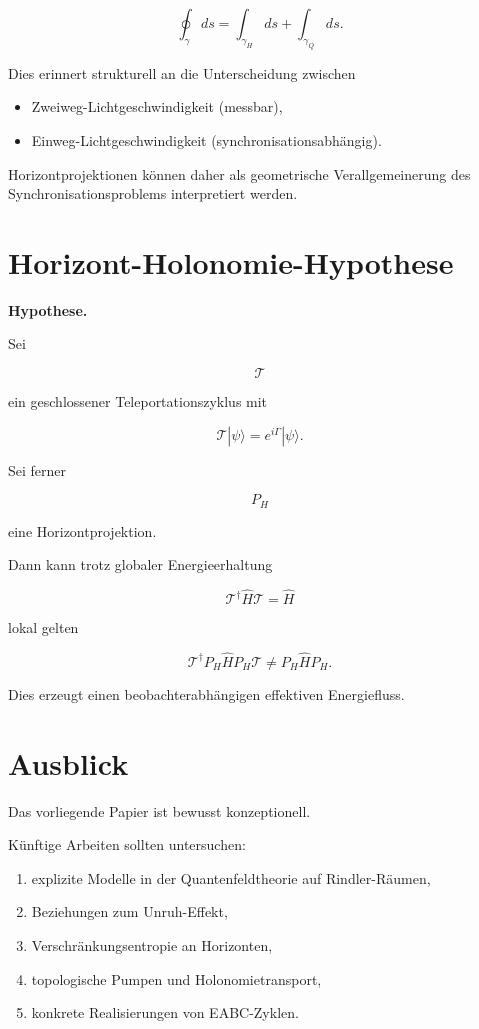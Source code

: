 \documentclass[11pt,a4paper]{article}
\begin{document}
	\[
	\oint_\gamma ds
	=
	\int_{\gamma_H} ds
	+
	\int_{\gamma_Q} ds.
	\]
	
	Dies erinnert strukturell an die Unterscheidung zwischen
	
	\begin{itemize}
		\item Zweiweg-Lichtgeschwindigkeit (messbar),
		\item Einweg-Lichtgeschwindigkeit (synchronisationsabhängig).
	\end{itemize}
	
	Horizontprojektionen können daher als geometrische Verallgemeinerung des Synchronisationsproblems interpretiert werden.
	
	\section{Horizont-Holonomie-Hypothese}
	
	\textbf{Hypothese.}
	
	Sei
	
	\[
	\mathcal T
	\]
	
	ein geschlossener Teleportationszyklus mit
	
	\[
	\mathcal T |\psi\rangle
	=
	e^{i\Gamma}
	|\psi\rangle.
	\]
	
	Sei ferner
	
	\[
	P_H
	\]
	
	eine Horizontprojektion.
	
	Dann kann trotz globaler Energieerhaltung
	
	\[
	\mathcal T^\dagger
	\hat H
	\mathcal T
	=
	\hat H
	\]
	
	lokal gelten
	
	\[
	\mathcal T^\dagger
	P_H\hat H P_H
	\mathcal T
	\neq
	P_H\hat H P_H.
	\]
	
	Dies erzeugt einen beobachterabhängigen effektiven Energiefluss.
	
	\section{Ausblick}
	
	Das vorliegende Papier ist bewusst konzeptionell.
	
	Künftige Arbeiten sollten untersuchen:
	
	\begin{enumerate}
		\item explizite Modelle in der Quantenfeldtheorie auf Rindler-Räumen,
		\item Beziehungen zum Unruh-Effekt,
		\item Verschränkungsentropie an Horizonten,
		\item topologische Pumpen und Holonomietransport,
		\item konkrete Realisierungen von EABC-Zyklen.
	\end{enumerate}
	
\end{document}
